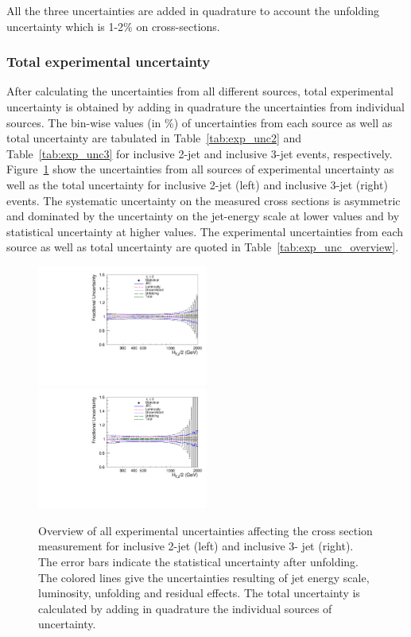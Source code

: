 All the three uncertainties are added in quadrature to account the unfolding uncertainty which is 1-2\% on cross-sections.

\subsubsection{Total experimental uncertainty}
After calculating the uncertainties from all different sources, total experimental uncertainty is obtained by adding in quadrature the 
uncertainties from individual sources. The bin-wise values (in \%) of uncertainties from each source as well as total uncertainty are tabulated in Table~\ref{tab:exp_unc2} and Table~\ref{tab:exp_unc3} for inclusive 2-jet and inclusive 3-jet events, respectively. Figure~\ref{fig:exp_unc} show the uncertainties from all sources of 
experimental uncertainty as well as the total uncertainty for inclusive 2-jet (left) and inclusive 3-jet (right) events. The systematic uncertainty on the measured cross 
sections is asymmetric and dominated by the uncertainty on the jet-energy scale at lower \httwo values and by statistical uncertainty at 
higher \httwo values. The experimental uncertainties from each source as well as total uncertainty are quoted in Table~\ref{tab:exp_unc_overview}. 

\begin{figure}[!htbp]
  \begin{center}
    \includegraphics[width=0.5\textwidth]{Plots_HT_2_150/Total_unc_all_2_NLO_add.pdf}%
    \includegraphics[width=0.5\textwidth]{Plots_HT_2_150/Total_unc_all_3_NLO_add.pdf}
    \caption{Overview of all experimental uncertainties affecting the cross section measurement for inclusive 2-jet (left) and inclusive 3-
      jet (right). The error bars indicate the statistical uncertainty after unfolding. The colored lines give the uncertainties resulting of 
      jet energy scale, luminosity, unfolding and residual effects. The total uncertainty is calculated by adding in 
      quadrature the individual sources of uncertainty.}
    \label{fig:exp_unc}
  \end{center}
\end{figure}


